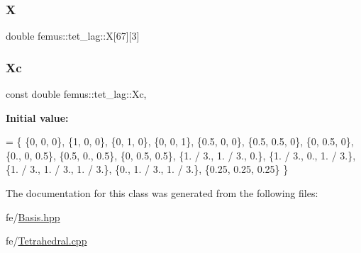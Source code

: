 \subsubsection{\texorpdfstring{X}{X}}
{\footnotesize\ttfamily double femus\+::tet\+\_\+lag\+::X\mbox{[}67\mbox{]}\mbox{[}3\mbox{]}\hspace{0.3cm}{\ttfamily [protected]}}

\mbox{\label{classfemus_1_1tet__lag_ab7215633825a9b4e13ca88fe247df06c}} 
\subsubsection{\texorpdfstring{Xc}{Xc}}
{\footnotesize\ttfamily const double femus\+::tet\+\_\+lag\+::\+Xc\hspace{0.3cm}{\ttfamily [static]}, {\ttfamily [protected]}}

{\bfseries Initial value\+:}
\begin{DoxyCode}
= \{
    \{0, 0, 0\},        \{1, 0, 0\},       \{0, 1, 0\},   \{0, 0, 1\},              
    \{0.5, 0, 0\},      \{0.5, 0.5, 0\},   \{0, 0.5, 0\},
    \{0.,  0, 0.5\},    \{0.5, 0., 0.5\},  \{0, 0.5, 0.5\},                       
    \{1. / 3., 1. / 3., 0.\}, \{1. / 3., 0., 1. / 3.\}, \{1. / 3., 1. / 3., 1. / 3.\}, \{0., 1. / 3., 1. / 3.\}, 
    \{0.25, 0.25, 0.25\} 
  \}
\end{DoxyCode}


The documentation for this class was generated from the following files\+:\begin{DoxyCompactItemize}
\item 
fe/\mbox{\hyperlink{_basis_8hpp}{Basis.\+hpp}}\item 
fe/\mbox{\hyperlink{_tetrahedral_8cpp}{Tetrahedral.\+cpp}}\end{DoxyCompactItemize}

